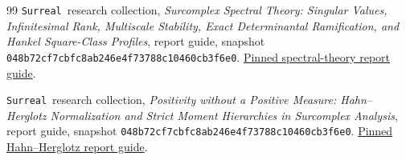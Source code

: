 \documentclass[11pt,oneside]{article}
\theoremstyle{definition}
\theoremstyle{remark}
\newcommand{\repoName}{\texttt{Surreal}}
\newcommand{\pin}{\texttt{048b72cf7cbfc8ab246e4f73788c10460cb3f6e0}}
\begin{document}
\begin{thebibliography}{99}
\repoName\ research collection,
\emph{Surcomplex Spectral Theory: Singular Values, Infinitesimal Rank,
Multiscale Stability, Exact Determinantal Ramification, and Hankel
Square-Class Profiles}, report guide, snapshot \pin.
\href{https://github.com/VladimirReshetnikov/Surreal/blob/048b72cf7cbfc8ab246e4f73788c10460cb3f6e0/docs/surcomplex/spectral-theory/README.md}{Pinned spectral-theory report guide}.

\repoName\ research collection,
\emph{Positivity without a Positive Measure: Hahn--Herglotz
Normalization and Strict Moment Hierarchies in Surcomplex Analysis},
report guide, snapshot \pin.
\href{https://github.com/VladimirReshetnikov/Surreal/blob/048b72cf7cbfc8ab246e4f73788c10460cb3f6e0/docs/surcomplex/hahn-herglotz-positivity/README.md}{Pinned Hahn--Herglotz report guide}.

\end{thebibliography}
\end{document}
